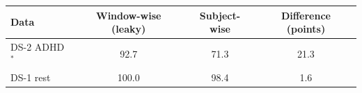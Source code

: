 \small
\begin{tabular}{lccc}
\hline
Data & Window-wise (leaky) & Subject-wise & Difference (points) \\
\hline
DS-2 ADHD$^\ast$ & 92.7 & 71.3 & 21.3 \\
DS-1 rest & 100.0 & 98.4 & 1.6 \\
\hline
\end{tabular}
